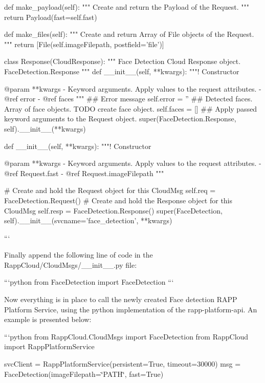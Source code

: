 \begin{DoxyVerb}    def make_payload(self):
        """ Create and return the Payload of the Request. """
        return Payload(fast=self.fast)

    def make_files(self):
        """ Create and return Array of File objects of the Request. """
        return [File(self.imageFilepath, postfield='file')]

    class Response(CloudResponse):
        """ Face Detection Cloud Response object. FaceDetection.Response """
        def __init__(self, **kwargs):
            """!
            Constructor

            @param **kwargs - Keyword arguments. Apply values to the request attributes.
            - @ref error
            - @ref faces
            """
            ## Error message
            self.error = ''
            ## Detected faces. Array of face objects. TODO create face object.
            self.faces = []
            ## Apply passed keyword arguments to the Request object.
            super(FaceDetection.Response, self).__init__(**kwargs)


    def __init__(self, **kwargs):
        """!
        Constructor

        @param **kwargs - Keyword arguments. Apply values to the request attributes.
            - @ref Request.fast
            - @ref Request.imageFilepath
        """

        # Create and hold the Request object for this CloudMsg
        self.req = FaceDetection.Request()
        # Create and hold the Response object for this CloudMsg
        self.resp = FaceDetection.Response()
        super(FaceDetection, self).__init__(svcname='face_detection', **kwargs)
\end{DoxyVerb}
 ```

Finally append the following line of code in the {\ttfamily Rapp\-Cloud/\-Cloud\-Msgs/\-\_\-\-\_\-init\-\_\-\-\_\-.\-py} file\-:

```python from Face\-Detection import Face\-Detection ```

Now everything is in place to call the newly created Face detection R\-A\-P\-P Platform Service, using the python implementation of the rapp-\/platform-\/api. An example is presented below\-:

```python from Rapp\-Cloud.\-Cloud\-Msgs import Face\-Detection from Rapp\-Cloud import Rapp\-Platform\-Service

svc\-Client = Rapp\-Platform\-Service(persistent=True, timeout=30000) msg = Face\-Detection(image\-Filepath=\char`\"{}\-P\-A\-T\-H\char`\"{}, fast=True)

